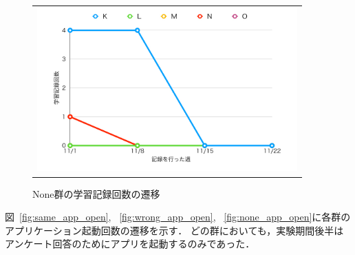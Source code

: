 \begin{figure}[htb]
\begin{center}
\begin{tabular}{c}
  \begin{minipage}[htb]{\linewidth}
  \begin{center}
  \includegraphics[width=10cm]{images/7/none_study_count.png}
  \caption{None群の学習記録回数の遷移}
  \label{fig:none_study_count}
  \end{center}
  \end{minipage}

\end{tabular}
\end{center}
\end{figure}

図~\ref{fig:same_app_open}, ~\ref{fig:wrong_app_open}, ~\ref{fig:none_app_open}に各群のアプリケーション起動回数の遷移を示す．
どの群においても，実験期間後半はアンケート回答のためにアプリを起動するのみであった．

